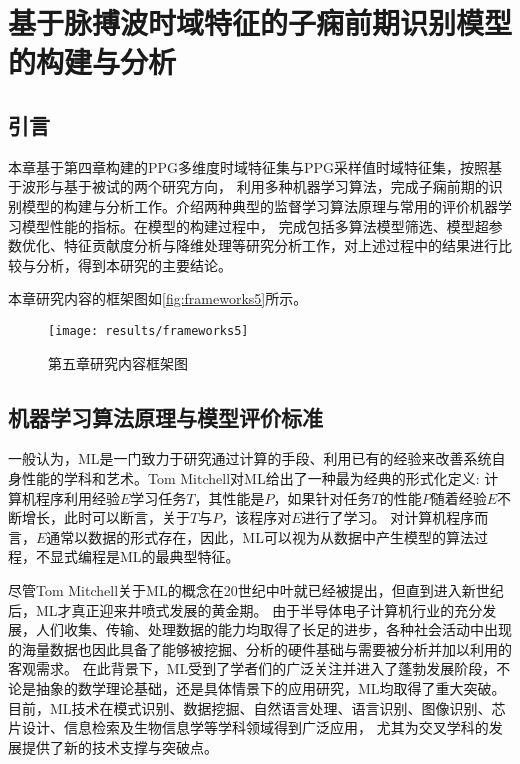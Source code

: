 \chapter{基于脉搏波时域特征的子痫前期识别模型的构建与分析}
\section{引言}
本章基于第四章构建的PPG多维度时域特征集与PPG采样值时域特征集，按照基于波形与基于被试的两个研究方向，
利用多种机器学习算法，完成子痫前期的识别模型的构建与分析工作。介绍两种典型的监督学习算法原理与常用的评价机器学习模型性能的指标。在模型的构建过程中，
完成包括多算法模型筛选、模型超参数优化、特征贡献度分析与降维处理等研究分析工作，对上述过程中的结果进行比较与分析，得到本研究的主要结论。

本章研究内容的框架图如\autoref{fig:frameworks5}所示。

\begin{figure}[htbp]
      \centering
      \texttt{[image: results/frameworks5]}
      \caption{\label{fig:frameworks5}第五章研究内容框架图}
\end{figure}
\vspace{-0.8cm} 

\section{机器学习算法原理与模型评价标准}
一般认为，ML是一门致力于研究通过计算的手段、利用已有的经验来改善系统自身性能的学科和艺术\cite{Zhou2016,Aurélien2018}。Tom Mitchell对ML给出了一种最为经典的形式化定义:
计算机程序利用经验$E$学习任务$T$，其性能是$P$，如果针对任务$T$的性能$P$随着经验$E$不断增长，此时可以断言，关于$T$与$P$，该程序对$E$进行了学习\cite{mitchell1997,Zhou2016}。
对计算机程序而言，$E$通常以数据的形式存在，因此，ML可以视为从数据中产生模型的算法过程，不显式编程是ML的最典型特征。

尽管Tom Mitchell关于ML的概念在20世纪中叶就已经被提出，但直到进入新世纪后，ML才真正迎来井喷式发展的黄金期。
由于半导体电子计算机行业的充分发展，人们收集、传输、处理数据的能力均取得了长足的进步，各种社会活动中出现的海量数据也因此具备了能够被挖掘、分析的硬件基础与需要被分析并加以利用的客观需求。
在此背景下，ML受到了学者们的广泛关注并进入了蓬勃发展阶段，不论是抽象的数学理论基础，还是具体情景下的应用研究，ML均取得了重大突破。
目前，ML技术在模式识别、数据挖掘、自然语言处理、语言识别、图像识别、芯片设计、信息检索及生物信息学等学科领域得到广泛应用，
尤其为交叉学科的发展提供了新的技术支撑与突破点\cite{Zhou2016,Aurélien2018,Li2017}。   

